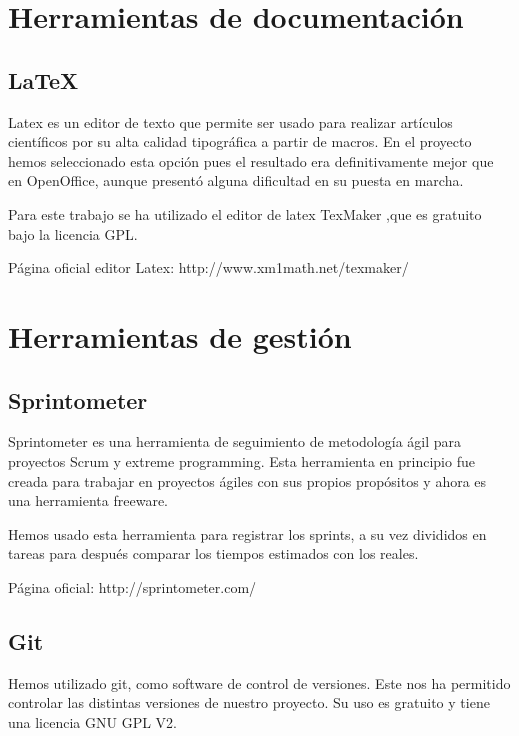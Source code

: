 \section{Herramientas de documentación}

\subsection{LaTeX}
Latex es un editor de texto que permite ser usado para realizar artículos científicos por su alta calidad tipográfica a partir de macros. \cite{LATEX}
En el proyecto hemos seleccionado esta opción pues el resultado era definitivamente mejor que en OpenOffice, aunque presentó alguna dificultad en su puesta en marcha.

Para este trabajo se ha utilizado el editor de latex TexMaker \cite{TEXMAKER},que es gratuito bajo la licencia GPL. 
 
Página oficial editor Latex: http://www.xm1math.net/texmaker/

\section{Herramientas de gestión}

\subsection{Sprintometer}


Sprintometer es una herramienta de seguimiento de metodología ágil para proyectos Scrum y extreme programming.
Esta herramienta en principio fue creada para trabajar en proyectos ágiles con sus propios propósitos y ahora es una herramienta freeware.\cite{SPRINTOMETER}

Hemos usado esta herramienta para registrar los sprints, a su vez divididos en tareas para después comparar los tiempos estimados con los reales.

Página oficial: http://sprintometer.com/

\subsection{Git}

Hemos utilizado git, como software de control de versiones\cite{GIT}. Este nos ha permitido controlar las distintas versiones de nuestro proyecto.
Su uso es gratuito y tiene una licencia GNU GPL V2.
